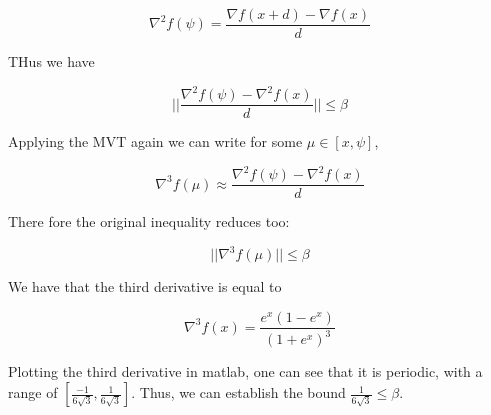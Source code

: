 \documentclass{article} %
\begin{document}
\begin{itemize}
\[
\nabla^2 f(\psi)  = \frac{ \nabla f(x + d) - \nabla f(x)}{d}
\]

THus we have 

\[
|| \frac{\nabla^2 f(\psi) - \nabla^2 f(x)}{d} || \leq \beta
\]

Applying the MVT again we can write for some $\mu \in [x, \psi]$, 

\[
\nabla^3 f( \mu) \approx \frac{\nabla^2 f(\psi) - \nabla^2 f(x)}{d}
\]

There fore the original inequality reduces too:

\[
|| \nabla^3 f(\mu) || \leq \beta
\]

We have that the third derivative is equal to

\[
\nabla^3 f(x) = \frac{e^{x}( 1- e^{x})}{( 1 + e^{x})^3}
\]

Plotting the third derivative in matlab, one can see that it is periodic, with a range of $[\frac{-1}{6 \sqrt{3}}, \frac{1}{6 \sqrt{3}}]$. Thus, we can establish the bound $  \frac{1}{6 \sqrt{3}} \leq \beta$. 








\end{itemize}
\end{document}
